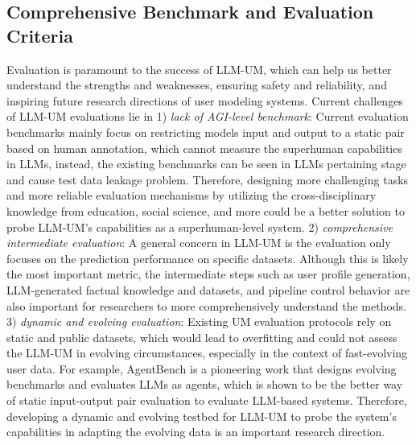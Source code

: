 \documentclass[11pt]{article}
\begin{document}
\subsection{Comprehensive Benchmark and Evaluation Criteria}
Evaluation is paramount to the success of LLM-UM, which can help us better understand the strengths and weaknesses, ensuring safety and reliability, and inspiring future research directions of user modeling systems.
 Current challenges of LLM-UM evaluations lie in 1) \textit{lack of AGI-level benchmark}: Current evaluation benchmarks mainly focus on restricting models input and output to a static pair based on human annotation, which cannot measure the superhuman capabilities in LLMs, instead, the existing benchmarks can be seen in LLMs pertaining stage and cause test data leakage problem. Therefore, designing more challenging tasks and more reliable evaluation mechanisms by utilizing the cross-disciplinary knowledge from education, social science, and more could be a better solution to probe LLM-UM's capabilities as a superhuman-level system.
2) \textit{comprehensive intermediate evaluation}: A general concern in LLM-UM is the evaluation only focuses on the prediction performance on specific datasets. Although this is likely the most important metric, the intermediate steps such as user profile generation, LLM-generated factual knowledge and datasets, and pipeline control behavior are also important for researchers to more comprehensively understand the methods.
3) \textit{dynamic and evolving evaluation}: Existing UM evaluation protocols rely on static and public datasets, which would lead to overfitting and could not assess the LLM-UM in evolving circumstances, especially in the context of fast-evolving user data. For example, AgentBench \cite{liu2023agentbench} is a pioneering work that designs evolving benchmarks and evaluates LLMs as agents, which is shown to be the better way of static input-output pair evaluation to evaluate LLM-based systems. Therefore, developing a dynamic and evolving testbed for LLM-UM to probe the system's capabilities in adapting the evolving data is an important research direction.


\end{document}
